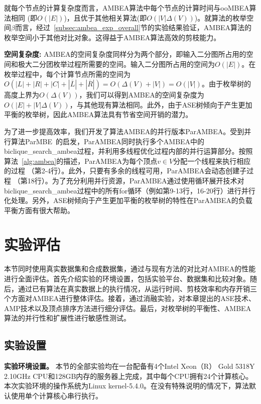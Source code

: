 就每个节点的计算复杂度而言，AMBEA算法中每个节点的计算时间与ooMBEA算法相同 (即$O(|E|)$)，且优于其他相关算法(即$O(|V|\Delta(V))$)。就算法的枚举空间$\beta$而言，经过~\ref{subsec:ambea_exp_overall}节的实验结果验证，AMBEA算法的枚举空间小于其他对比对象。这得益于AMBEA算法高效的剪枝能力。


\textbf{空间复杂度: } AMBEA的空间复杂度同样分为两个部分，即输入二分图所占用的空间和极大二分团枚举过程所需要的空间。输入二分图所占用的空间为$O(|E|)$。在枚举过程中，每个计算节点所需的空间为$O(|L|+|R|+|C|+|\overline{L}| + |\overline{R}|) = O(\Delta(V) + |V|) = O(|V|)$。由于枚举树的高度上界为$O(\Delta(V))$，我们可以得到AMBEA的空间复杂度为$O(|E|+|V|\Delta(V))$，与其他现有算法相同。此外，由于ASE树倾向于产生更加平衡的枚举树，因此AMBEA算法具有节省空间开销的潜力。

为了进一步提高效率，我们开发了算法AMBEA的并行版本ParAMBEA。受到并行算法ParMBE~\cite{parMBE18}的启发，ParAMBEA同时执行多个AMBEA中的\textsf{biclique\_search\_ambea}过程，并利用多线程优化过程内部的并行运算部分。按照算法~\ref{alg:ambea}的描述，ParAMBEA为每个顶点$v\in V$分配一个线程来执行相应的过程 （第2-4行）。此外，只要有多余的线程可用，ParAMBEA会动态创建子过程 （第18行）。为了充分利用并行资源，ParAMBEA通过使用循环展开技术对\textsf{biclique\_search\_ambea}过程中的所有for循环（例如第9-13行，16-20行）进行并行化处理。另外，ASE树倾向于产生更加平衡的枚举树的特性在ParAMBEA的负载平衡方面有很大帮助。

\section{实验评估}

本节同时使用真实数据集和合成数据集，通过与现有方法的对比对AMBEA的性能进行全面评估。首先介绍实验的环境设置，包括实验平台、数据集和比较对象。随后，通过已有算法在真实数据上的执行情况，从运行时间、剪枝效率和内存开销三个方面对AMBEA进行整体评估。接着，通过消融实验，对本章提出的ASE技术、AMP技术以及顶点排序方法进行细分评估。最后，对枚举树的平衡性、AMBEA算法的并行性和扩展性进行敏感性测试。

\subsection{实验设置}

\textbf{实验环境设置。} 本节的全部实验均在一台配备有4个Intel Xeon（R） Gold 5318Y 2.10GHz CPU和128GB内存的服务器上完成，其中每个CPU拥有24个计算核心。本次实验环境的操作系统为Linux kernel-5.4.0。在没有特殊说明的情况下，算法默认使用单个计算核心串行执行。

